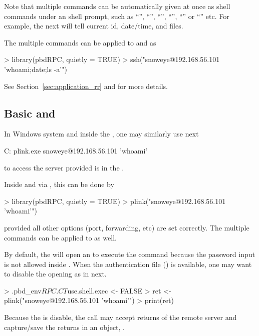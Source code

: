Note that multiple commands can be automatically given at once
as shell commands under an shell prompt, such as ``\code{;}'', ``\code{\&\&}'',
``\code{>}'', ``\code{<}'', ``\code{|}'' or ``\code{\&}'' etc.
For example, the next will tell current id, date/time, and files.
The multiple commands can be applied to  and  as
\begin{Code}[title=Multipel commands to \code{ssh()} in \pkg{pbdRPC} and \proglang{R}]
> library(pbdRPC, quietly = TRUE)
> ssh("snoweye@192.168.56.101 'whoami;date;ls -a'")
\end{Code}
See Section~\ref{sec:application_rr} and  for
more details.


\subsection[Basic \code{plink.exe} and \code{plink()}]{Basic  and }
\label{sec:basic_plink}

In Windows system and inside the , one may similarly use next
\begin{Command}[title=Basic \code{plink.exe} in \code{cmd.exe}]
C:\> plink.exe snoweye@192.168.56.101 'whoami'
\end{Command}
to access the server provided  is in the .

Inside  and via , this can be done by
\begin{Code}[title=Basic \code{plink()} in \pkg{pbdRPC} and \proglang{R}]
> library(pbdRPC, quietly = TRUE)
> plink("snoweye@192.168.56.101 'whoami'")
\end{Code}
provided all other options (port, forwarding, etc) are set correctly.
The multiple commands can be applied to  as well.

By default,
the  will open an  to execute the
command  because the password input is not allowed inside
.
When the authentication file () is available,
one may want to disable the opening  as in next.
\begin{Code}[title=Advance \code{plink()} in \pkg{pbdRPC} and \proglang{R}]
> .pbd_env$RPC.CT$use.shell.exec <- FALSE
> ret <- plink("snoweye@192.168.56.101 'whoami'")
> print(ret)
\end{Code}
Because the  is disable, the  call
may accept returns of the remote server and capture/save the returns
in an  object, .

